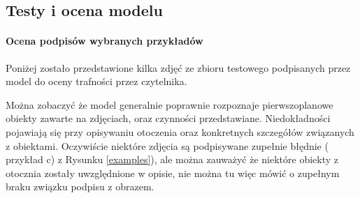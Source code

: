 \subsection{Testy i ocena modelu}
\paragraph{Ocena podpisów wybranych przykładów}
Poniżej zostało przedstawione kilka zdjęć ze zbioru testowego podpisanych przez model do oceny trafności przez czytelnika.

Można zobaczyć że model generalnie poprawnie rozpoznaje pierwszoplanowe obiekty zawarte na zdjęciach, oraz czynności przedstawiane. Niedokładności pojawiają się przy opisywaniu otoczenia oraz konkretnych szczegółów związanych z obiektami. Oczywiście niektóre zdjęcia są podpisywane zupełnie błędnie ( przykład c) z Rysunku \ref{examples}), ale można zauważyć że niektóre obiekty z otocznia zostały uwzględnione w opisie, nie można tu więc mówić o zupełnym braku związku podpisu z obrazem.
